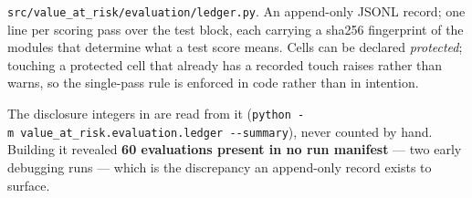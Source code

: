 \texttt{src/value\_at\_risk/evaluation/ledger.py}. An append-only JSONL record; one line per scoring pass
over the test block, each carrying a sha256 fingerprint of the modules that determine what a
test score means. Cells can be declared \emph{protected}; touching a protected cell that already has a
recorded touch raises rather than warns, so the single-pass rule is enforced in code rather than
in intention.

The disclosure integers in  are read from it (\texttt{python\ -m\ value\_at\_risk.evaluation.ledger\ -\/-summary}), never counted by hand. Building it revealed \textbf{60 evaluations present in no run
manifest} --- two early debugging runs --- which is the discrepancy an append-only record exists to
surface.
